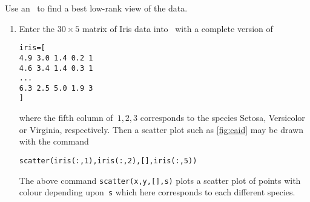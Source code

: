 \begin{example}
\begin{solution} 
Use an \svd\ to find a best low-rank view of the data.
\begin{enumerate}
\item Enter the \(30\times5\) matrix of Iris data into \script\  with a complete version of
\begin{verbatim}
iris=[
4.9 3.0 1.4 0.2 1
4.6 3.4 1.4 0.3 1
...
6.3 2.5 5.0 1.9 3
]
\end{verbatim}
where the fifth column of~\(1,2,3\) corresponds to the species Setosa, Versicolor or Virginia, respectively.
\setbox\ajrqrbox\hbox{}%
\marginpar{\usebox{\ajrqrbox\\[2ex]}}%
Then a scatter plot such as \autoref{fig:eaid} may be drawn with the command
\begin{verbatim}
scatter(iris(:,1),iris(:,2),[],iris(:,5))
\end{verbatim}
The above command \verb|scatter(x,y,[],s)|  plots a scatter plot of points with colour depending upon~\verb|s| which here corresponds to each different species.


\end{enumerate}
\end{solution}
\end{example}
